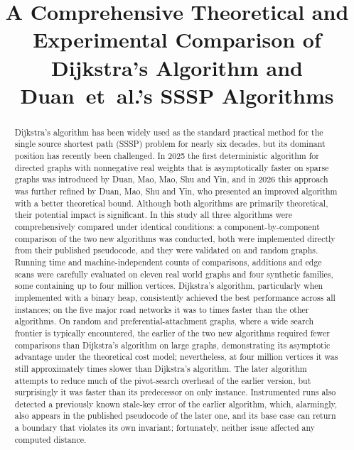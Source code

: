 \documentclass[conference,a4paper]{IEEEtran}
\begin{document}
\title{A Comprehensive Theoretical and Experimental Comparison of Dijkstra's Algorithm and
Duan~et~al.'s SSSP Algorithms}

\author{
}

\maketitle

\begin{abstract}
Dijkstra's algorithm has been widely used as the standard practical method for the single source
shortest path (SSSP) problem for nearly six decades, but its dominant position has recently been
challenged. In 2025 the first deterministic algorithm for directed graphs with nonnegative real
weights that is asymptotically faster on sparse graphs was introduced by Duan, Mao, Mao, Shu and
Yin, and in 2026 this approach was further refined by Duan, Mao, Shu and Yin, who presented an
improved algorithm with a better theoretical bound. Although both algorithms are primarily
theoretical, their potential impact is significant. In this study all three algorithms were
comprehensively compared under identical conditions: a component-by-component comparison of the
two new algorithms was conducted, both were implemented directly from their published pseudocode,
and they were validated on \ValSmallTrials{} and \ValMediumTrials{} random graphs. Running time
and machine-independent counts of comparisons, additions and edge scans were carefully evaluated
on eleven real world graphs and four synthetic families, some containing up to four million
vertices. Dijkstra's algorithm, particularly when implemented with a binary heap, consistently
achieved the best performance across all instances; on the five major road networks it was
\RealRatioMin{} to \RealRatioMax{} times faster than the other algorithms. On random and
preferential-attachment graphs, where a wide search frontier is typically encountered, the
earlier of the two new algorithms required fewer comparisons than Dijkstra's algorithm on large
graphs, demonstrating its asymptotic advantage under the theoretical cost model; nevertheless, at
four million vertices it was still approximately \ScaleRandTwoFiveLast{} times slower than
Dijkstra's algorithm. The later algorithm attempts to reduce much of the pivot-search overhead of
the earlier version, but surprisingly it was faster than its predecessor on only
\RealTwoSixFasterWord{} instance. Instrumented runs also detected a previously known stale-key
error of the earlier algorithm, which, alarmingly, also appears in the published pseudocode of
the later one, and its base case can return a boundary that violates its own invariant;
fortunately, neither issue affected any computed distance.
\end{abstract}
\end{document}
